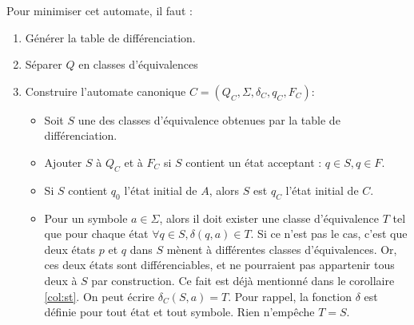 	 Pour minimiser cet automate, il faut :
	 \begin{enumerate}
	 	\item Générer la table de différenciation.
	 	\item Séparer $Q$ en classes d'équivalences
	 	\item Construire l'automate canonique $C=(Q_C,\Sigma, \delta_C, q_C, F_C)$:
	 	\begin{itemize}
	 		\item Soit $S$ une des classes d'équivalence obtenues par la table de différenciation.
	 		\item Ajouter $S$ à $Q_C$ et à $F_C$ si $S$ contient un état acceptant : $q\in S, q\in F$.
	 		\item Si $S$ contient $q_0$ l'état initial de $A$, alors $S$ est $q_C$ l'état initial de $C$.
	 		\item Pour un symbole $a \in \Sigma$, alors il doit exister une classe d'équivalence $T$ tel que pour chaque état $\forall q \in S,\delta(q,a) \in T$. Si ce n'est pas le cas, c'est que deux états $p$ et $q$ dans $S$ mènent à différentes classes d'équivalences. Or, ces deux états sont différenciables, et ne pourraient pas appartenir tous deux à $S$ par construction. Ce fait est déjà mentionné dans le corollaire \ref{col:st}. On peut écrire $\delta_C(S,a)=T$. Pour rappel, la fonction $\delta$ est définie pour tout état et tout symbole. Rien n'empêche $T=S$.
	 	\end{itemize}
	 \end{enumerate}
	 
